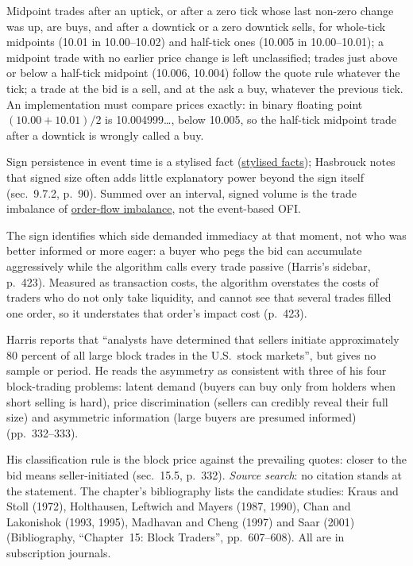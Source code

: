 \begin{qfmethod}
 Midpoint trades after an uptick, or after a zero tick whose last non-zero change was up, are buys, and after a downtick or a zero downtick sells, for whole-tick midpoints (10.01 in 10.00--10.02) and half-tick ones (10.005 in 10.00--10.01); a midpoint trade with no earlier price change is left unclassified; trades just above or below a half-tick midpoint (10.006, 10.004) follow the quote rule whatever the tick; a trade at the bid is a sell, and at the ask a buy, whatever the previous tick. An implementation must compare prices exactly: in binary floating point $(10.00+10.01)/2$ is 10.004999\dots, below 10.005, so the half-tick midpoint trade after a downtick is wrongly called a buy.

Sign persistence in event time is a stylised fact (\hyperref[ev:high-frequency-stylised-facts]{stylised facts}); Hasbrouck notes that signed size often adds little explanatory power beyond the sign itself (sec.~9.7.2, p.~90). Summed over an interval, signed volume is the trade imbalance of \hyperref[def:order-flow-imbalance]{order-flow imbalance}, not the event-based OFI.

 The sign identifies which side demanded immediacy at that moment, not who was better informed or more eager: a buyer who pegs the bid can accumulate aggressively while the algorithm calls every trade passive (Harris's sidebar, p.~423). Measured as transaction costs, the algorithm overstates the costs of traders who do not only take liquidity, and cannot see that several trades filled one order, so it understates that order's impact cost (p.~423).

Harris reports that ``analysts have determined that sellers initiate approximately 80 percent of all large block trades in the U.S.\ stock markets'', but gives no sample or period. He reads the asymmetry as consistent with three of his four block-trading problems: latent demand (buyers can buy only from holders when short selling is hard), price discrimination (sellers can credibly reveal their full size) and asymmetric information (large buyers are presumed informed) (pp.~332--333).

His classification rule is the block price against the prevailing quotes: closer to the bid means seller-initiated (sec.~15.5, p.~332). \emph{Source search}: no citation stands at the statement. The chapter's bibliography lists the candidate studies: Kraus and Stoll (1972), Holthausen, Leftwich and Mayers (1987, 1990), Chan and Lakonishok (1993, 1995), Madhavan and Cheng (1997) and Saar (2001) (Bibliography, ``Chapter~15: Block Traders'', pp.~607--608). All are in subscription journals.


\end{qfmethod}
